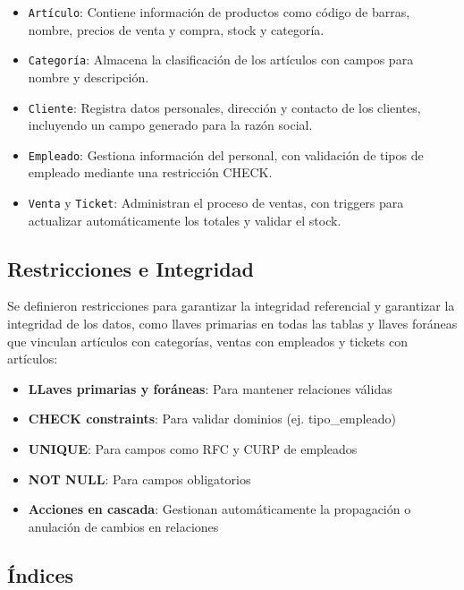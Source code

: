 \documentclass[a4paper, 12pt]{article}
\begin{document}
\begin{itemize}
  \item \texttt{Artículo}: Contiene información de productos como código de barras, nombre, precios de venta y compra, stock y categoría.
  \item \texttt{Categoría}: Almacena la clasificación de los artículos con campos para nombre y descripción.
  \item \texttt{Cliente}: Registra datos personales, dirección y contacto de los clientes, incluyendo un campo generado para la razón social.
  \item \texttt{Empleado}: Gestiona información del personal, con validación de tipos de empleado mediante una restricción CHECK.
  \item \texttt{Venta} y \texttt{Ticket}: Administran el proceso de ventas, con triggers para actualizar automáticamente los totales y validar el stock.
\end{itemize}


\subsection{Restricciones e Integridad}
 Se definieron restricciones para garantizar la integridad referencial y garantizar la integridad de los datos, como llaves primarias en todas las tablas y llaves foráneas que vinculan artículos con categorías, ventas con empleados y tickets con artículos:

\begin{itemize}
    \item \textbf{LLaves primarias y foráneas}: Para mantener relaciones válidas
    \item \textbf{CHECK constraints}: Para validar dominios (ej. tipo\_empleado)
    \item \textbf{UNIQUE}: Para campos como RFC y CURP de empleados
    \item \textbf{NOT NULL}: Para campos obligatorios
    \item \textbf{Acciones en cascada}: Gestionan automáticamente la propagación o anulación de cambios en relaciones
\end{itemize}

\subsection{Índices}
\end{document}
